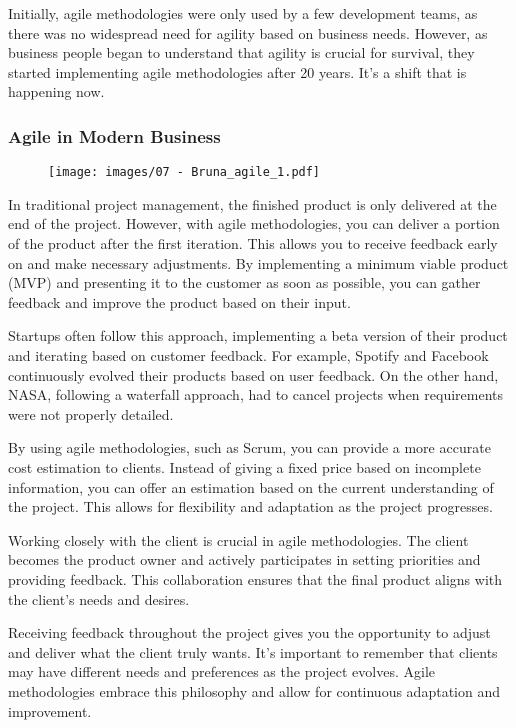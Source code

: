 Initially, agile methodologies were only used by a few development
teams, as there was no widespread need for agility based on business
needs. However, as business people began to understand that agility is
crucial for survival, they started implementing agile methodologies
after 20 years. It's a shift that is happening now.

\subsubsection{Agile in Modern Business}

\begin{figure}[!h]
  \centering
  \texttt{[image: images/07 - Bruna\_agile\_1.pdf]}
\end{figure}

In traditional project management, the finished product is only
delivered at the end of the project. However, with agile methodologies,
you can deliver a portion of the product after the first iteration. This
allows you to receive feedback early on and make necessary adjustments.
By implementing a minimum viable product (MVP) and presenting it to the
customer as soon as possible, you can gather feedback and improve the
product based on their input.

Startups often follow this approach, implementing a beta version of
their product and iterating based on customer feedback. For example,
Spotify and Facebook continuously evolved their products based on user
feedback. On the other hand, NASA, following a waterfall approach, had
to cancel projects when requirements were not properly detailed.

By using agile methodologies, such as Scrum, you can provide a more
accurate cost estimation to clients. Instead of giving a fixed price
based on incomplete information, you can offer an estimation based on
the current understanding of the project. This allows for flexibility
and adaptation as the project progresses.

Working closely with the client is crucial in agile methodologies. The
client becomes the product owner and actively participates in setting
priorities and providing feedback. This collaboration ensures that the
final product aligns with the client's needs and desires.

Receiving feedback throughout the project gives you the opportunity to
adjust and deliver what the client truly wants. It's important to
remember that clients may have different needs and preferences as the
project evolves. Agile methodologies embrace this philosophy and allow
for continuous adaptation and improvement.


